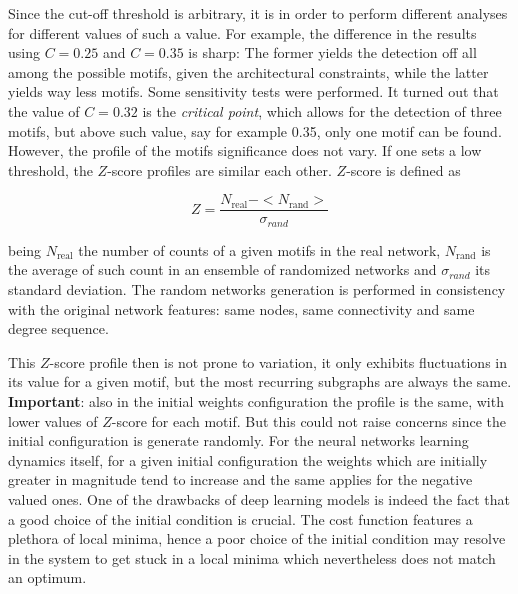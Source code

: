 \documentclass[a4paper,12pt]{article}
\begin{document}
Since the cut-off threshold is arbitrary, it is in order to perform different analyses for different values of such a value. For example, the difference in the results using $C = 0.25$ and $C = 0.35$ is sharp: The former yields the detection off all among the possible motifs, given the architectural constraints, while the latter yields way less motifs. Some sensitivity tests were performed. It turned out that the value of $C = 0.32$ is the \textit{critical point}, which allows for the detection of three motifs, but above such value, say for example 0.35, only one motif can be found. However, the profile of the motifs significance does not vary. If one sets a low threshold, the $Z$-score profiles are similar each other. $Z$-score is defined as 

\begin{equation}
	Z = \dfrac{N_{\text{real}} - <N_{\text{rand}}>}{\sigma_{rand}}
\end{equation}

being $N_{\text{real}}$ the number of counts of a given motifs in the real network, $N_{\text{rand}}$ is the average of such count in an ensemble of randomized networks and $\sigma_{rand}$ its standard deviation. The random networks generation is performed in consistency with the original network features: same nodes, same connectivity and same degree sequence. 

This $Z$-score profile then is not prone to variation, it only exhibits fluctuations in its value for a given motif, but the most recurring subgraphs are always the same. \textbf{Important}: also in the initial weights configuration the profile is the same, with lower values of $Z$-score for each motif. But this could not raise concerns since the initial configuration is generate randomly. For the neural networks learning dynamics itself, for a given initial configuration the weights which are initially greater in magnitude tend to increase and the same applies for the negative valued ones. One of the drawbacks of deep learning models is indeed the fact that a good choice of the initial condition is crucial. The cost function features a plethora of local minima, hence a poor choice of the initial condition may resolve in the system to get stuck in a local minima which nevertheless does not match an optimum. 
\end{document}

